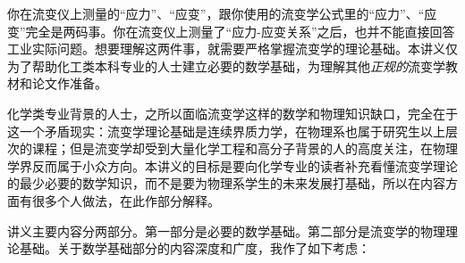 \documentclass[main.tex]{subfiles}
\begin{document}
你在流变仪上测量的“应力”、“应变”，跟你使用的流变学公式里的“应力”、“应变”完全是两码事。你在流变仪上测量了“应力-应变关系”之后，也并不能直接回答工业实际问题。想要理解这两件事，就需要严格掌握流变学的理论基础。本讲义仅为了帮助化工类本科专业的人士建立必要的数学基础，为理解其他\emph{正规的}流变学教材和论文作准备。

化学类专业背景的人士，之所以面临流变学这样的数学和物理知识缺口，完全在于这一个矛盾现实：流变学理论基础是连续界质力学，在物理系也属于研究生以上层次的课程；但是流变学却受到大量化学工程和高分子背景的人的高度关注，在物理学界反而属于小众方向。本讲义的目标是要向化学专业的读者补充看懂流变学理论的最少必要的数学知识，而不是要为物理系学生的未来发展打基础，所以在内容方面有很多个人做法，在此作部分解释。

讲义主要内容分两部分。第一部分是必要的数学基础。第二部分是流变学的物理理论基础。关于数学基础部分的内容深度和广度，我作了如下考虑：
\end{document}
